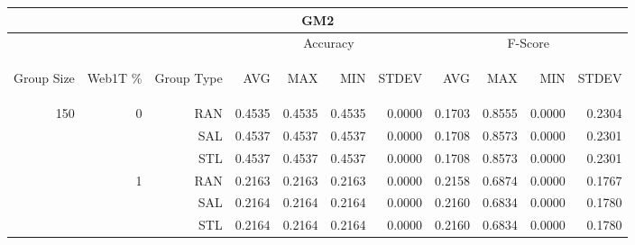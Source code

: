 \begin{center}
\begin{table}[htbp] 
 \begin{center}
\begin{tabular}{ | r | r | r | r | r | r | r | r | r | r | r |}
\hline
\multicolumn{11}{|c|}{GM2}\\
\hline
 & & & \multicolumn{4}{|c|}{Accuracy} & \multicolumn{4}{|c|}{F-Score}\\ \cline{4-11}
\begin{sideways}Group Size\end{sideways} & \begin{sideways}Web1T \%\end{sideways} & \begin{sideways}Group Type\end{sideways} & \begin{sideways}AVG\end{sideways} & \begin{sideways}MAX\end{sideways} & \begin{sideways}MIN\end{sideways} & \begin{sideways}STDEV\end{sideways} & \begin{sideways}AVG\end{sideways} & \begin{sideways}MAX\end{sideways} & \begin{sideways}MIN\end{sideways} & \begin{sideways}STDEV\end{sideways}\\
\hline
\multirow{18}{*}{150}
 & \multirow{3}{*}{0} & RAN & 0.4535 & 0.4535 & 0.4535 & 0.0000 & 0.1703 & 0.8555 & 0.0000 & 0.2304\\ \cline{3-11}
 &   & SAL & 0.4537 & 0.4537 & 0.4537 & 0.0000 & 0.1708 & 0.8573 & 0.0000 & 0.2301\\ \cline{3-11}
 &   & STL & 0.4537 & 0.4537 & 0.4537 & 0.0000 & 0.1708 & 0.8573 & 0.0000 & 0.2301\\ \cline{2-11}
 & \multirow{3}{*}{1} & RAN & 0.2163 & 0.2163 & 0.2163 & 0.0000 & 0.2158 & 0.6874 & 0.0000 & 0.1767\\ \cline{3-11}
 &   & SAL & 0.2164 & 0.2164 & 0.2164 & 0.0000 & 0.2160 & 0.6834 & 0.0000 & 0.1780\\ \cline{3-11}
 &   & STL & 0.2164 & 0.2164 & 0.2164 & 0.0000 & 0.2160 & 0.6834 & 0.0000 & 0.1780\\ \cline{2-11}

\end{tabular}
\end{center}
\end{table}
\end{center}
